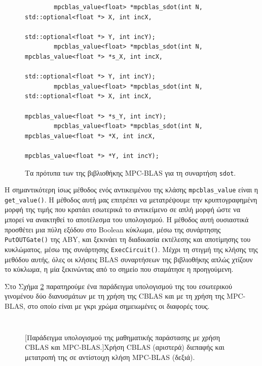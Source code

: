 \begin{figure}[h!]
    \begin{center}
        \begin{verbatim}
        mpcblas_value<float> *mpcblas_sdot(int N, std::optional<float *> X, int incX,
                                                std::optional<float *> Y, int incY);
        mpcblas_value<float> *mpcblas_sdot(int N, mpcblas_value<float *> *s_X, int incX,
                                                std::optional<float *> Y, int incY);
        mpcblas_value<float> *mpcblas_sdot(int N, std::optional<float *> X, int incX,
                                                mpcblas_value<float *> *s_Y, int incY);
        mpcblas_value<float> *mpcblas_sdot(int N, mpcblas_value<float *> *X, int incX,
                                                mpcblas_value<float *> *Y, int incY);
        \end{verbatim}
    \end{center}
    \caption{Τα πρότυπα των της βιβλιοθήκης MPC-BLAS για τη συναρτήση \texttt{sdot}.}
    \label{code:mpcblas-sdot}
\end{figure}

Η σημαντικότερη ίσως μέθοδος ενός αντικειμένου της κλάσης \texttt{mpcblas_value} είναι η \texttt{get_value()}. Η μέθοδος αυτή μας επιτρέπει να μετατρέψουμε την κρυπτογραφημένη μορφή της τιμής που κρατάει εσωτερικά το αντικείμενο σε απλή μορφή ώστε να μπορεί να ανακτηθεί το αποτέλεσμα του υπολογισμού. Η μέθοδος αυτή ουσιαστικά προσθέτει μια πύλη εξόδου στο Boolean κύκλωμα, μέσω της συνάρτησης \texttt{PutOUTGate()} της ABY, και ξεκινάει τη διαδικασία εκτέλεσης και αποτίμησης του κυκλώματος, μέσω της συνάρτησης \texttt{ExecCircuit()}. Μέχρι τη στιγμή της κλήσης της μεθόδου αυτής, όλες οι κλήσεις BLAS συναρτήσεων της βιβλιοθήκης απλώς χτίζουν το κύκλωμα, η μία ξεκινώντας από το σημείο που σταμάτησε η προηγούμενη.

Στο Σχήμα \ref{code:mpc-blas-differences-1} παρατηρούμε ένα παράδειγμα υπολογισμού της του εσωτερικού γινομένου δύο διανυσμάτων με τη χρήση της CBLAS και με τη χρήση της MPC-BLAS, στο οποίο είναι με γκρι χρώμα σημειωμένες οι διαφορές τους.

\begin{figure}[htbp]
    \begin{minipage}{0.45\textwidth}
        \centering
        \inputminted[fontsize=\scriptsize,frame=single, linenos]{cpp}{./01_body/code/cblas-differences-1.cpp}
    \end{minipage}\hfill
    \begin{minipage}{0.45\textwidth}
        \centering
        \inputminted[fontsize=\scriptsize,frame=single, linenos, highlightlines={1,2,6,7,9},highlightcolor=lightgray]{cpp}{./01_body/code/mpc-blas-differences-1.cpp}
    \end{minipage}
    [Παράδειγμα υπολογισμού της μαθηματικής παράστασης με χρήση CBLAS και MPC-BLAS.]{Χρήση CBLAS (αριστερά) διεπαφής και μετατροπή της σε αντίστοιχη κλήση MPC-BLAS (δεξιά).}
    \label{code:mpc-blas-differences-1}
\end{figure}

